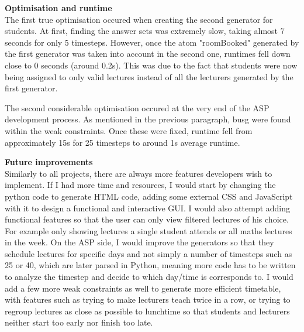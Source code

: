 \documentclass{article}
\begin{document}
\begin{large}
		\textbf{Optimisation and runtime}\\

		The first true optimisation occured when creating the second generator for students. 
		At first, finding the answer sets was extremely slow, taking almost 7 seconds for only 5 timesteps.
		However, once the atom "roomBooked" generated by the first generator was taken into account in the second one, runtimes fell down close to 0 seconds (around 0.2s).
		This was due to the fact that students were now being assigned to only valid lectures instead of all the lecturers generated by the first generator.
		
		The second considerable optimisation occured at the very end of the ASP development process. 
		As mentioned in the previous paragraph, busg were found within the weak constraints.
		Once these were fixed, runtime fell from approximately 15s for 25 timesteps to around 1s average runtime.
		\newline

		\textbf{Future improvements}\\

		Similarly to all projects, there are always more features developers wish to implement.
		If I had more time and resources, I would start by changing the python code to generate HTML code, adding some external CSS and JavaScript with it to design a functional and interactive GUI.
		I would also attempt adding functional features so that the user can only view filtered lectures of his choice. For example only showing lectures a single student attends or all maths lectures in the week.
		On the ASP side, I would improve the generators so that they schedule lectures for specific days and not simply a number of timesteps such as 25 or 40, which are later parsed in Python, meaning more code has to be written to analyze the timestep and decide to which day/time is corresponds to. 
		I would add a few more weak constraints as well to generate more efficient timetable, with features such as trying to make lecturers teach twice in a row, or trying to regroup lectures as close as possible to lunchtime so that students and lecturers neither start too early nor finish too late.
	
	\end{large}
\end{document}
